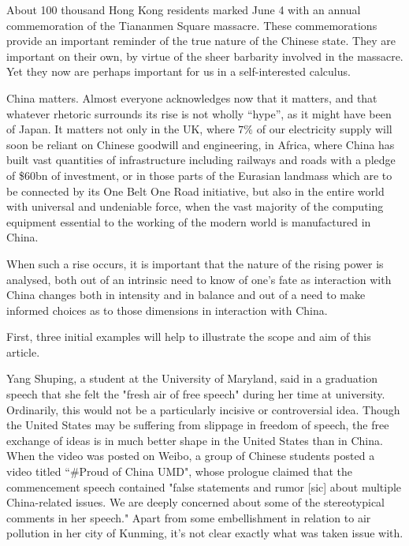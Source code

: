 \documentclass[1opt,a4paper]{article}
\begin{document}
\begin{multicols}{2}

About 100 thousand Hong Kong residents marked June 4 with an annual commemoration of the Tiananmen Square massacre. These commemorations provide an important reminder of the true nature of the Chinese state. They are important on their own, by virtue of the sheer barbarity involved in the massacre. Yet they now are perhaps important for us in a self-interested calculus.

China matters. Almost everyone acknowledges now that it matters, and that whatever rhetoric surrounds its rise is not wholly ``hype'', as it might have been of Japan. It matters not only in the UK, where $7\%$ of our electricity supply will soon be reliant on Chinese goodwill and engineering\cite{hinkley}, in Africa, where China has built vast quantities of infrastructure including railways and roads with a pledge of \$60bn of investment\cite{ifrica}, or in those parts of the Eurasian landmass which are to be connected by its One Belt One Road initiative, but also in the entire world with universal and undeniable force, when the vast majority of the computing equipment essential to the working of the modern world is manufactured in China.

When such a rise occurs, it is important that the nature of the rising power is analysed, both out of an intrinsic need to know of one's fate as interaction with China changes both in intensity and in balance and out of a need to make informed choices as to those dimensions in interaction with China.

First, three initial examples will help to illustrate the scope and aim of this article.

Yang Shuping, a student at the University of Maryland, said in a graduation speech that she felt the "fresh air of free speech" during her time at university\cite{yang}. Ordinarily, this would not be a particularly incisive or controversial idea. Though the United States may be suffering from slippage in freedom of speech, the free exchange of ideas is in much better shape in the United States than in China\cite{press}\cite{freedomhouse}. When the video was posted on Weibo, a group of Chinese students posted a video titled ``\#Proud of China UMD", whose prologue claimed that the commencement speech contained "false statements and rumor [sic] about multiple China-related issues. We are deeply concerned about some of the stereotypical comments in her speech."\cite{umd} Apart from some embellishment in relation to air pollution in her city of Kunming, it's not clear exactly what was taken issue with.


\end{multicols}
\end{document}
